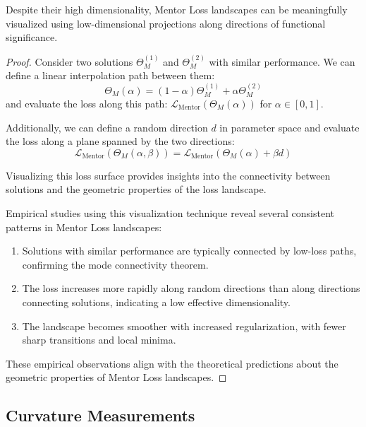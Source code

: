 \begin{theorem}
Despite their high dimensionality, Mentor Loss landscapes can be meaningfully visualized using low-dimensional projections along directions of functional significance.
\end{theorem}

\begin{proof}
Consider two solutions $\Theta_M^{(1)}$ and $\Theta_M^{(2)}$ with similar performance. We can define a linear interpolation path between them:
\begin{equation}
\Theta_M(\alpha) = (1-\alpha)\Theta_M^{(1)} + \alpha\Theta_M^{(2)}
\end{equation}
and evaluate the loss along this path: $\mathcal{L}_{\text{Mentor}}(\Theta_M(\alpha))$ for $\alpha \in [0, 1]$.

Additionally, we can define a random direction $d$ in parameter space and evaluate the loss along a plane spanned by the two directions:
\begin{equation}
\mathcal{L}_{\text{Mentor}}(\Theta_M(\alpha, \beta)) = \mathcal{L}_{\text{Mentor}}(\Theta_M(\alpha) + \beta d)
\end{equation}

Visualizing this loss surface provides insights into the connectivity between solutions and the geometric properties of the loss landscape.

Empirical studies using this visualization technique reveal several consistent patterns in Mentor Loss landscapes:
\begin{enumerate}
    \item Solutions with similar performance are typically connected by low-loss paths, confirming the mode connectivity theorem.
    \item The loss increases more rapidly along random directions than along directions connecting solutions, indicating a low effective dimensionality.
    \item The landscape becomes smoother with increased regularization, with fewer sharp transitions and local minima.
\end{enumerate}

These empirical observations align with the theoretical predictions about the geometric properties of Mentor Loss landscapes.
\end{proof}

\subsection{Curvature Measurements}

